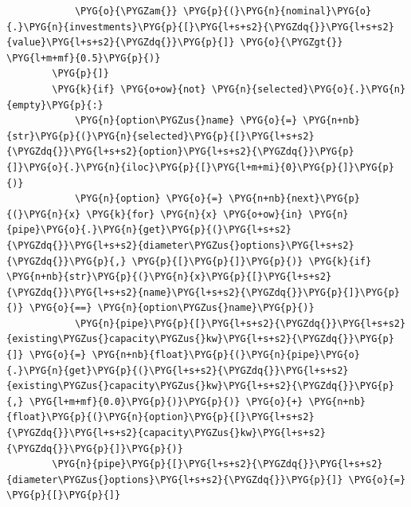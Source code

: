 \begin{Verbatim}
            \PYG{o}{\PYGZam{}} \PYG{p}{(}\PYG{n}{nominal}\PYG{o}{.}\PYG{n}{investments}\PYG{p}{[}\PYG{l+s+s2}{\PYGZdq{}}\PYG{l+s+s2}{value}\PYG{l+s+s2}{\PYGZdq{}}\PYG{p}{]} \PYG{o}{\PYGZgt{}} \PYG{l+m+mf}{0.5}\PYG{p}{)}
        \PYG{p}{]}
        \PYG{k}{if} \PYG{o+ow}{not} \PYG{n}{selected}\PYG{o}{.}\PYG{n}{empty}\PYG{p}{:}
            \PYG{n}{option\PYGZus{}name} \PYG{o}{=} \PYG{n+nb}{str}\PYG{p}{(}\PYG{n}{selected}\PYG{p}{[}\PYG{l+s+s2}{\PYGZdq{}}\PYG{l+s+s2}{option}\PYG{l+s+s2}{\PYGZdq{}}\PYG{p}{]}\PYG{o}{.}\PYG{n}{iloc}\PYG{p}{[}\PYG{l+m+mi}{0}\PYG{p}{]}\PYG{p}{)}
            \PYG{n}{option} \PYG{o}{=} \PYG{n+nb}{next}\PYG{p}{(}\PYG{n}{x} \PYG{k}{for} \PYG{n}{x} \PYG{o+ow}{in} \PYG{n}{pipe}\PYG{o}{.}\PYG{n}{get}\PYG{p}{(}\PYG{l+s+s2}{\PYGZdq{}}\PYG{l+s+s2}{diameter\PYGZus{}options}\PYG{l+s+s2}{\PYGZdq{}}\PYG{p}{,} \PYG{p}{[}\PYG{p}{]}\PYG{p}{)} \PYG{k}{if} \PYG{n+nb}{str}\PYG{p}{(}\PYG{n}{x}\PYG{p}{[}\PYG{l+s+s2}{\PYGZdq{}}\PYG{l+s+s2}{name}\PYG{l+s+s2}{\PYGZdq{}}\PYG{p}{]}\PYG{p}{)} \PYG{o}{==} \PYG{n}{option\PYGZus{}name}\PYG{p}{)}
            \PYG{n}{pipe}\PYG{p}{[}\PYG{l+s+s2}{\PYGZdq{}}\PYG{l+s+s2}{existing\PYGZus{}capacity\PYGZus{}kw}\PYG{l+s+s2}{\PYGZdq{}}\PYG{p}{]} \PYG{o}{=} \PYG{n+nb}{float}\PYG{p}{(}\PYG{n}{pipe}\PYG{o}{.}\PYG{n}{get}\PYG{p}{(}\PYG{l+s+s2}{\PYGZdq{}}\PYG{l+s+s2}{existing\PYGZus{}capacity\PYGZus{}kw}\PYG{l+s+s2}{\PYGZdq{}}\PYG{p}{,} \PYG{l+m+mf}{0.0}\PYG{p}{)}\PYG{p}{)} \PYG{o}{+} \PYG{n+nb}{float}\PYG{p}{(}\PYG{n}{option}\PYG{p}{[}\PYG{l+s+s2}{\PYGZdq{}}\PYG{l+s+s2}{capacity\PYGZus{}kw}\PYG{l+s+s2}{\PYGZdq{}}\PYG{p}{]}\PYG{p}{)}
        \PYG{n}{pipe}\PYG{p}{[}\PYG{l+s+s2}{\PYGZdq{}}\PYG{l+s+s2}{diameter\PYGZus{}options}\PYG{l+s+s2}{\PYGZdq{}}\PYG{p}{]} \PYG{o}{=} \PYG{p}{[}\PYG{p}{]}


\end{Verbatim}
